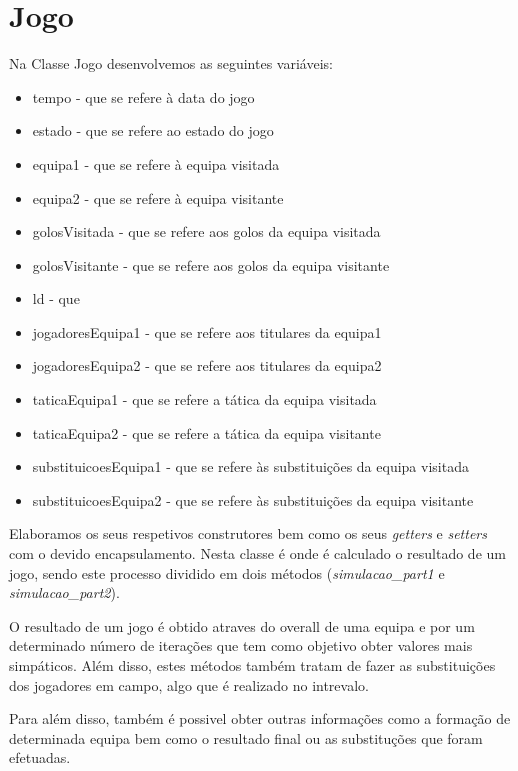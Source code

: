 \documentclass[a4paper,12pt]{article}
\begin{document}
\section{Jogo}
    Na Classe Jogo desenvolvemos as seguintes variáveis:
    \begin{itemize}
        \item tempo - que se refere à data do jogo
        \item estado - que se refere ao estado do jogo
        \item equipa1 - que se refere à equipa visitada
        \item equipa2 - que se refere à equipa visitante
        \item golosVisitada - que se refere aos golos da equipa visitada
        \item golosVisitante - que se refere aos golos da equipa visitante
        \item ld - que
        \item jogadoresEquipa1 - que se refere aos titulares da equipa1
        \item jogadoresEquipa2 - que se refere aos titulares da equipa2
        \item taticaEquipa1 - que se refere a tática da equipa visitada
        \item taticaEquipa2 - que se refere a tática da equipa visitante
        \item substituicoesEquipa1 - que se refere às substituições da equipa visitada
        \item substituicoesEquipa2 - que se refere às substituições da equipa visitante
    \end{itemize} \par
    Elaboramos os seus respetivos construtores bem como os seus \emph{getters} e \emph{setters} com o devido encapsulamento.
    Nesta classe é onde é calculado o resultado de um jogo, sendo este processo dividido em dois métodos
(\emph{simulacao\_part1} e \emph{simulacao\_part2}).\par
    O resultado de um jogo é obtido atraves do overall de uma equipa e por um determinado número de iterações que tem
como objetivo obter valores mais simpáticos. Além disso, estes métodos também tratam de fazer as substituições dos
jogadores em campo, algo que é realizado no intrevalo. \par
    Para além disso, também é possivel obter outras informações como a formação de determinada equipa bem como o resultado
final ou as substituções que foram efetuadas.
\end{document}
